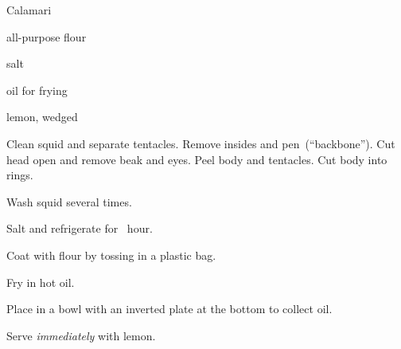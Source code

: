 \begin{recipe}{Calamari}{}{}

\begin{ingredients}
\item {}
\item all-purpose flour
\item salt
\item oil for frying
\item lemon, wedged
\end{ingredients}

\begin{directions}
\item Clean squid and separate tentacles. Remove insides and pen~(``backbone''). Cut head open and remove beak and eyes. Peel body and tentacles. Cut body into rings.
\item Wash squid several times.
\item Salt and refrigerate for \half~hour.
\item Coat with flour by tossing in a plastic bag.
\item Fry in hot oil.
\item Place in a bowl with an inverted plate at the bottom to collect oil.
\item Serve \emph{immediately} with lemon.
\end{directions}

\end{recipe}
